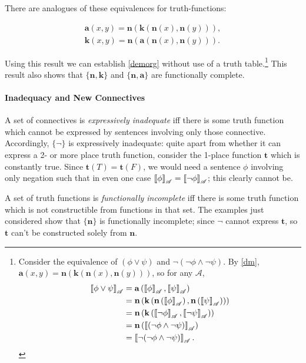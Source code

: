There are analogues of these equivalences for truth-functions: \begin{theorem} \label{dm}\begin{align*}
\mathbf{a}(x,y) = \mathbf{n}(\mathbf{k}(\mathbf{n}(x),\mathbf{n}(y))),\\
\mathbf{k}(x,y) = \mathbf{n}(\mathbf{a}(\mathbf{n}(x),\mathbf{n}(y))).
\end{align*}\end{theorem} Using this result we can establish \autoref{demorg} without use of a truth table.\footnote{Consider the equivalence of $(\phi\vee\psi)$ and $¬(¬ \phi \wedge ¬ \psi)$. By \autoref{dm}, $\mathbf{a}(x,y) = \mathbf{n} \left(\mathbf{k} \left( \mathbf{n} \left( x \right), \mathbf{n} \left( y \right)  \right) \right)$, so for any $\mathscr{A}$, \begin{align*}
		\left\llbracket \phi\vee\psi\right\rrbracket_{\mathscr{A}} &= \mathbf{a}\left(\left\llbracket \phi\right\rrbracket_{\mathscr{A}},\left\llbracket \psi\right\rrbracket_{\mathscr{A}}\right)\\
 &= \mathbf{n}\left(\mathbf{k}\left(\mathbf{n}\left(\left\llbracket \phi\right\rrbracket_{\mathscr{A}}\right),\mathbf{n}\left(\left\llbracket \psi\right\rrbracket_{\mathscr{A}}\right)\right)\right) \\
	&= \mathbf{n} \left(\mathbf{k}\left(\left\llbracket \neg\phi\right\rrbracket_{\mathscr{A}},\left\llbracket \neg\psi\right\rrbracket_{\mathscr{A}}\right)\right)\\
	&= \mathbf{n}\left(\left\llbracket (\neg\phi\wedge\neg\psi)\right\rrbracket_{\mathscr{A}}\right)\\
	&= \left\llbracket \neg(\neg\phi\wedge\neg\psi)\right\rrbracket_{\mathscr{A}}.
\end{align*}} This result also shows that $\{\mathbf{n},\mathbf{k}\}$ and $\{\mathbf{n},\mathbf{a}\}$ are functionally complete.





\paragraph{Inadequacy and New Connectives}

A set of connectives is \emph{expressively inadequate} iff there is some truth function which cannot be expressed by sentences involving only those connective. Accordingly, $\{\neg\}$  is expressively inadequate: quite apart from whether it can express a 2- or more place truth function, consider the 1-place function $\mathbf{t}$ which is constantly true. Since $\mathbf{t}(T)=\mathbf{t}(F)$,  we would need a sentence $\phi$ involving only negation such that in even one case $\left\llbracket \phi\right\rrbracket_{\mathscr{A}}=\left\llbracket \neg\phi\right\rrbracket_{\mathscr{A}}$; this clearly cannot be. 

A set of truth functions is \emph{functionally incomplete} iff there is some truth function which is not constructible from functions in that set. The examples just considered show that $\{\mathbf{n\}}$ is functionally incomplete; since $¬$ cannot express $\mathbf{t}$, so $\mathbf{t}$ can't be constructed solely from $\mathbf{n}$.


